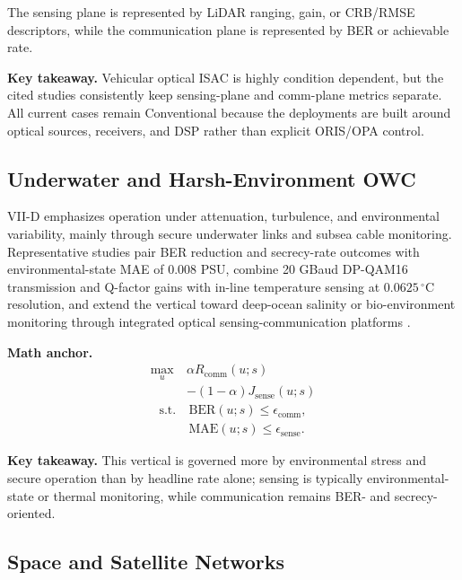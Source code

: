 \documentclass[letterpaper,journal]{IEEEtran}
\begin{document}
The sensing plane is represented by LiDAR ranging, gain, or CRB/RMSE descriptors, while the communication plane is represented by BER or achievable rate.

\textbf{Key takeaway.} Vehicular optical ISAC is highly condition dependent, but the cited studies consistently keep sensing-plane and comm-plane metrics separate. All current cases remain Conventional because the deployments are built around optical sources, receivers, and DSP rather than explicit ORIS/OPA control.

\subsection{Underwater and Harsh-Environment OWC}

VII-D emphasizes operation under attenuation, turbulence, and environmental variability, mainly through secure underwater links and subsea cable monitoring. Representative studies pair BER reduction and secrecy-rate outcomes with environmental-state MAE of 0.008 PSU, combine 20 GBaud DP-QAM16 transmission and Q-factor gains with in-line temperature sensing at $0.0625\,^{\circ}\mathrm{C}$ resolution, and extend the vertical toward deep-ocean salinity or bio-environment monitoring through integrated optical sensing-communication platforms \cite{O_ISAC_027,O_ISAC_127,O_ISAC_130,O_ISAC_220}.

\textbf{Math anchor.}
\begin{equation}
    \begin{split}
        \max_u\  & \alpha R_{\mathrm{comm}}(u;s)      \\
                 & -(1-\alpha)J_{\mathrm{sense}}(u;s)
    \end{split}
\end{equation}
\begin{equation}
    \begin{split}
        \text{s.t.}\  & \mathrm{BER}(u;s)\le \epsilon_{\mathrm{comm}},  \\
                      & \mathrm{MAE}(u;s)\le \epsilon_{\mathrm{sense}}.
    \end{split}
\end{equation}

\textbf{Key takeaway.} This vertical is governed more by environmental stress and secure operation than by headline rate alone; sensing is typically environmental-state or thermal monitoring, while communication remains BER- and secrecy-oriented.

\subsection{Space and Satellite Networks}
\end{document}
